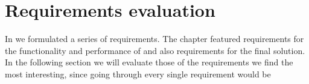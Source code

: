 \section{Requirements evaluation}
\label{sec:requirementsevaluation}

In  we formulated a series of requirements. The chapter featured requirements for the functionality and performance of \productname{} and also requirements for the final solution. In the following section we will evaluate those of the requirements we find the most interesting, since going through every single requirement would be 

   	